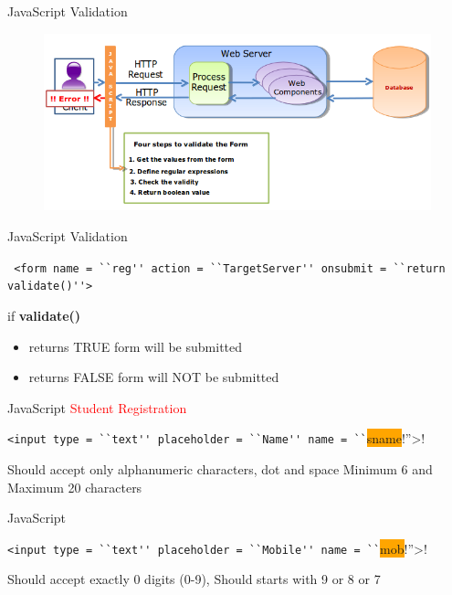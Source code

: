 \documentclass[14pt]{beamer}
\begin{document}
\begin{frame}{JavaScript}
Validation
\begin{figure}[H]
\includegraphics[scale=.45]{steps-to-validate.png}
\end{figure}
\end{frame}

\begin{frame}{JavaScript}
Validation
\begin{block}{}
\lstinline! <form name = ``reg'' action = ``TargetServer'' onsubmit = ``return validate()''>!
\end{block}
if \textbf{validate()}
\begin{itemize}
 \item returns TRUE form will be submitted
 \item returns FALSE form will NOT be submitted
\end{itemize}
\end{frame}

\begin{frame}{JavaScript}
\textcolor{red}{Student Registration}

\vspace{1pc}
\begin{block}{}
\lstinline!<input type = ``text'' placeholder = ``Name'' name = ``!\colorbox{orange}{sname}!''>!
\end{block} 
Should accept only alphanumeric characters, dot and space Minimum 6 and Maximum 20 characters
\end{frame}

\begin{frame}{JavaScript}
\begin{block}{}
\lstinline!<input type = ``text'' placeholder = ``Mobile'' name = ``!\colorbox{orange}{mob}!''>!
\end{block} 
Should accept exactly 0 digits (0-9), Should starts with 9 or 8 or 7
\end{frame}
\end{document}
